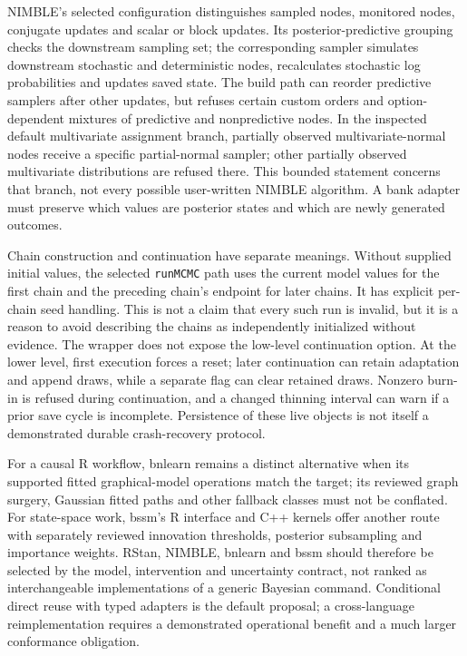NIMBLE's selected configuration distinguishes sampled nodes, monitored nodes, conjugate updates and scalar or block updates. Its posterior-predictive grouping checks the downstream sampling set; the corresponding sampler simulates downstream stochastic and deterministic nodes, recalculates stochastic log probabilities and updates saved state. The build path can reorder predictive samplers after other updates, but refuses certain custom orders and option-dependent mixtures of predictive and nonpredictive nodes. In the inspected default multivariate assignment branch, partially observed multivariate-normal nodes receive a specific partial-normal sampler; other partially observed multivariate distributions are refused there. This bounded statement concerns that branch, not every possible user-written NIMBLE algorithm. A bank adapter must preserve which values are posterior states and which are newly generated outcomes.~\citep{exec25_bsw_nimble}

Chain construction and continuation have separate meanings. Without supplied initial values, the selected \texttt{runMCMC} path uses the current model values for the first chain and the preceding chain's endpoint for later chains. It has explicit per-chain seed handling. This is not a claim that every such run is invalid, but it is a reason to avoid describing the chains as independently initialized without evidence. The wrapper does not expose the low-level continuation option. At the lower level, first execution forces a reset; later continuation can retain adaptation and append draws, while a separate flag can clear retained draws. Nonzero burn-in is refused during continuation, and a changed thinning interval can warn if a prior save cycle is incomplete. Persistence of these live objects is not itself a demonstrated durable crash-recovery protocol.~\citep{exec25_bsw_nimble}

For a causal R workflow, bnlearn remains a distinct alternative when its supported fitted graphical-model operations match the target; its reviewed graph surgery, Gaussian fitted paths and other fallback classes must not be conflated. For state-space work, bssm's R interface and C++ kernels offer another route with separately reviewed innovation thresholds, posterior subsampling and importance weights. RStan, NIMBLE, bnlearn and bssm should therefore be selected by the model, intervention and uncertainty contract, not ranked as interchangeable implementations of a generic Bayesian command. Conditional direct reuse with typed adapters is the default proposal; a cross-language reimplementation requires a demonstrated operational benefit and a much larger conformance obligation.~\citep{exec24_bnlearn_sources,exec24_bnlearn_contract,exec25_cdyn_bssm,exec25_cdyn_choice,exec25_bsw_choice}

